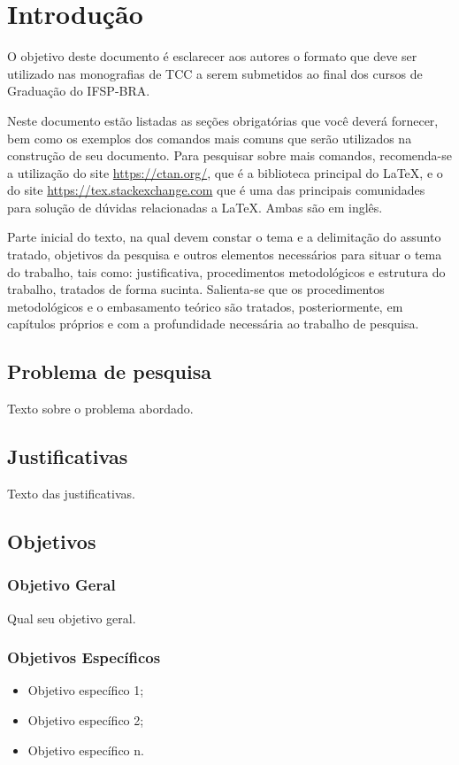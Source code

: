 \chapter{Introdução}
\label{cap:01}

O objetivo deste documento é esclarecer aos autores o formato que deve ser utilizado nas monografias de TCC a serem submetidos ao final dos cursos de Graduação do IFSP-BRA.

Neste documento estão listadas as seções obrigatórias que você deverá fornecer, bem como os exemplos dos comandos mais comuns que serão utilizados na construção de seu documento. Para pesquisar sobre mais comandos, recomenda-se a utilização do site \url{https://ctan.org/}, que é a biblioteca principal do \LaTeX, e o do site \url{https://tex.stackexchange.com} que é uma das principais comunidades para solução de dúvidas relacionadas a \LaTeX. Ambas são em inglês.

Parte inicial do texto, na qual devem constar o tema e a delimitação do assunto tratado, objetivos da pesquisa e outros elementos necessários para situar o tema do trabalho, tais como: justificativa, procedimentos metodológicos e estrutura do trabalho, tratados de forma sucinta. Salienta-se que os procedimentos metodológicos e o embasamento teórico são tratados, posteriormente, em capítulos próprios e com a profundidade necessária ao trabalho de pesquisa.

\section{Problema de pesquisa}

Texto sobre o problema abordado.

\section{Justificativas}

Texto das justificativas.

\section{Objetivos}

\subsection{Objetivo Geral}

Qual seu objetivo geral.

\subsection{Objetivos Específicos}
\begin{itemize}
	\item Objetivo específico 1;
	\item Objetivo específico 2;
	\item Objetivo específico n.
\end{itemize}

